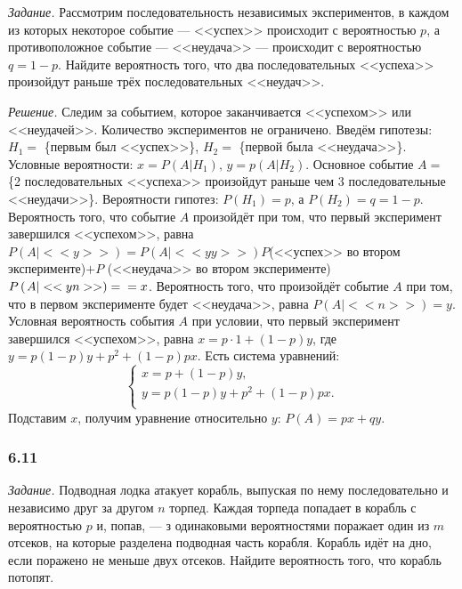 \textit{Задание.}
Рассмотрим последовательность независимых экспериментов,
в каждом из которых некоторое событие ---
<<успех>> происходит с вероятностью $p$, а противоположное событие --- <<неудача>> --- происходит с вероятностью $q = 1 - p$.
Найдите вероятность того, что два последовательных <<успеха>> произойдут раньше трёх последовательных <<неудач>>.

\textit{Решение.} Следим за событием, которое заканчивается <<успехом>> или <<неудачей>>.
Количество экспериментов не ограничено.
Введём гипотезы: $H_1 =$ \{первым был <<успех>>\}, $H_2 =$ \{первой была <<неудача>>\}.
Условные вероятности: $x = P \left( \left. A \right| H_1 \right), \, y = p \left( \left. A \right| H_2 \right) $.
Основное событие $A =$ \{2 последовательных <<успеха>> произойдут раньше чем 3 последовательные <<неудачи>>\}.
Вероятности гипотез: $P \left( H_1 \right) = p$, а $P \left( H_2 \right) = q = 1 - p$.
Вероятность того, что событие $A$ произойдёт при том,
что первый эксперимент завершился <<успехом>>,
равна
$P \left( \left. A \right| <<y>> \right) =
P \left( \left. A \right| <<yy>> \right) P$(<<успех>> во втором эксперименте)$+ P$ (<<неудача>> во втором эксперименте)$P \left( \left. A \right| <<yn>> \right) = \\ = x$.
Вероятность того, что произойдёт событие $A$ при том, что в первом эксперименте будет <<неудача>>, равна $P \left( \left. A \right| <<n>> \right) = y$.
Условная вероятность события $A$ при условии, что первый эксперимент завершился <<успехом>>, равна $x = p \cdot 1 + \left( 1-p \right) y$, где $y = p \left( 1-p \right) y + p^2 + \left( 1-p \right) px$.
Есть система уравнений:
$$
\begin{cases}
x = p + \left( 1-p \right) y,\\
y = p \left( 1-p \right) y + p^2 + \left( 1-p \right) px.\\
\end{cases}
$$
Подставим $x$, получим уравнение относительно $y: \, P \left( A \right) = px + qy$.

\subsubsection*{6.11}

\textit{Задание.} Подводная лодка атакует корабль, выпуская по нему последовательно и независимо друг за другом $n$ торпед.
Каждая торпеда попадает в корабль с вероятностью $p$ и, попав, ---
з одинаковыми вероятностями поражает один из $m$ отсеков, на которые разделена подводная часть корабля.
Корабль идёт на дно, если поражено не меньше двух отсеков.
Найдите вероятность того, что корабль потопят.

